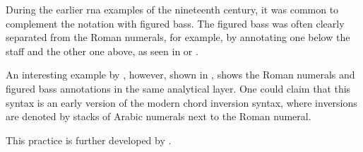 
During the earlier \gls{rna} examples of the nineteenth
century, it was common to complement the notation with
figured bass. The figured bass was often clearly separated
from the Roman numerals, for example, by annotating one
below the staff and the other one above, as seen in
 or
.

An interesting example by \textcite{bussler1878praktische},
however, shown in
, shows the
Roman numerals and figured bass annotations in the same
analytical layer. One could claim that this syntax is an
early version of the modern chord inversion syntax, where
inversions are denoted by stacks of Arabic numerals next to
the Roman numeral.


This practice is further developed by
\textcite{emery1879elements}. 


